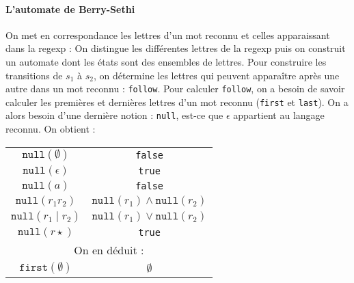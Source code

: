 \documentclass{cours}
\begin{document}
\paragraph*{L'automate de Berry-Sethi}
On met en correspondance les lettres d'un mot reconnu et celles apparaissant dans la regexp :
On distingue les différentes lettres de la regexp puis on construit un automate dont les états sont des ensembles de lettres.
Pour construire les transitions de $s_{1}$ à $s_{2}$, on détermine les lettres qui peuvent apparaître après une autre dans un mot reconnu : \texttt{follow}. Pour calculer \texttt{follow}, on a besoin de savoir calculer les premières et dernières lettres d'un mot reconnu (\texttt{first} et \texttt{last}). On a alors besoin d'une dernière notion : \texttt{null}, est-ce que $\epsilon$ appartient au langage reconnu. On obtient :
\begin{center}
    \begin{tabular}{c@{ = }c}
        \toprule
        $\texttt{null}(\emptyset)$             & \texttt{false}                                                                                                        \\
        $\texttt{null}(\epsilon)$              & \texttt{true}                                                                                                         \\
        $\texttt{null}(a)$                     & \texttt{false}                                                                                                        \\
        $\texttt{null}(r_{1}r_{2})$            & $\texttt{null}(r_{1}) \land  \texttt{null}(r_{2})$                                                                    \\
        $\texttt{null}(r_{1}\mid r_{2})$       & $\texttt{null}(r_{1}) \lor  \texttt{null}(r_{2})$                                                                     \\
        $\texttt{null}(r\star)$                & \texttt{true}                                                                                                         \\
        \midrule
        \multicolumn{2}{c}{On en déduit : }                                                                                                                            \\
        \midrule
        $\texttt{first}(\emptyset)$            & $\emptyset$                                                                                                           \\

\end{tabular}
\end{center}
\end{document}
